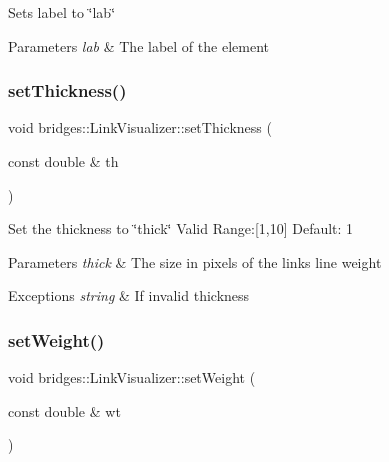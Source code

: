 Sets label to \char`\"{}lab\char`\"{}


\begin{DoxyParams}{Parameters}
{\em lab} & The label of the element \\
\hline
\end{DoxyParams}
\mbox{\label{classbridges_1_1_link_visualizer_a92a88e0e4c2f0c8c68f33578743c6502}} 
\subsubsection{\texorpdfstring{set\+Thickness()}{setThickness()}}
{\footnotesize\ttfamily void bridges\+::\+Link\+Visualizer\+::set\+Thickness (\begin{DoxyParamCaption}\item[{const double \&}]{th }\end{DoxyParamCaption})\hspace{0.3cm}{\ttfamily [inline]}}

Set the thickness to \char`\"{}thick\char`\"{} Valid Range\+:\mbox{[}1,10\mbox{]} Default\+: 1


\begin{DoxyParams}{Parameters}
{\em thick} & The size in pixels of the link\textquotesingle{}s line weight \\
\hline
\end{DoxyParams}

\begin{DoxyExceptions}{Exceptions}
{\em string} & If invalid thickness \\
\hline
\end{DoxyExceptions}
\mbox{\label{classbridges_1_1_link_visualizer_a08b606d2451026a11e110d0b94f97538}} 
\subsubsection{\texorpdfstring{set\+Weight()}{setWeight()}}
{\footnotesize\ttfamily void bridges\+::\+Link\+Visualizer\+::set\+Weight (\begin{DoxyParamCaption}\item[{const double \&}]{wt }\end{DoxyParamCaption})\hspace{0.3cm}{\ttfamily [inline]}}

